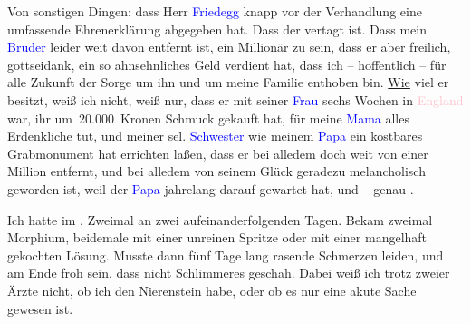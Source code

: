 \pstart
           Von sonstigen Dingen: dass Herr \textcolor{blue}{Friedegg}{}\ledrightnote{\textcolor{blue}{Ernst Egon Friedegg}}
               knapp vor der Verhandlung eine umfassende Ehrenerklärung abgegeben hat. Dass der
                  \label{K_L03430-5v}\label{K_L03430-5h} vertagt ist. Dass mein \textcolor{blue}{Bruder}{}\ledrightnote{{$\rightarrow$}\textcolor{blue}{Ignaz Salzmann}} leider weit davon entfernt ist, ein Millionär {\pb}zu sein, dass er aber freilich,
               gottseidank, ein so ahnsehnliches Geld verdient hat, dass ich – hoffentlich – für
               alle Zukunft der Sorge um ihn und um meine Familie enthoben bin. \uline{Wie} viel er besitzt, weiß ich nicht, weiß nur, dass er mit seiner \textcolor{blue}{Frau}{}\ledrightnote{{$\rightarrow$}\textcolor{blue}{Agathe Salzmann}} sechs Wochen in \textcolor{pink}{England}{}\ledrightnote{\textcolor{pink}{England}} war, ihr um 20.000 Kronen Schmuck gekauft
               hat, für meine \textcolor{blue}{Mama}{}\ledrightnote{{$\rightarrow$}\textcolor{blue}{Marie Salzmann}} alles
               Erdenkliche tut, und meiner sel. \textcolor{blue}{Schwester}{}\ledrightnote{{$\rightarrow$}\textcolor{blue}{Katharina Salzmann}} wie meinem \textcolor{blue}{Papa}{}\ledrightnote{{$\rightarrow$}\textcolor{blue}{Philipp Salzmann}} ein kostbares Grabmonument hat errichten laßen, dass er bei alledem
               doch weit von einer Million entfernt, und bei alledem von seinem Glück geradezu
               melancholisch geworden ist, weil der \textcolor{blue}{Papa}{}\ledrightnote{{$\rightarrow$}\textcolor{blue}{Philipp Salzmann}} jahrelang darauf gewartet hat, und – genau \label{K_L03430-6v}\label{K_L03430-6h}.\pend
           
\pstart
           Ich hatte im \label{K_L03430-7v}\label{K_L03430-7h}. Zweimal an zwei aufeinanderfolgenden Tagen. Bekam zweimal Morphium,
               beidemale mit einer unreinen Spritze oder mit einer mangelhaft gekochten Lösung.
               Musste dann fünf Tage lang rasende Schmerzen leiden, und am Ende froh sein, dass
               nicht Schlimmeres geschah. Dabei weiß ich trotz zweier Ärzte nicht, ob ich den
               Nierenstein habe, oder ob es nur eine akute Sache gewesen ist.\pend
           
